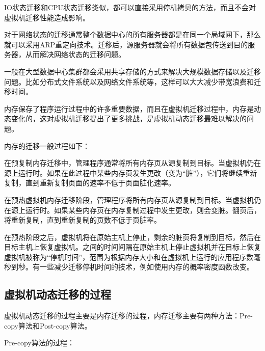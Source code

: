 IO状态迁移和CPU状态迁移类似，都可以直接采用停机拷贝的方法，而且不会对虚拟机迁移性能造成影响。

对于网络状态的迁移通常整个数据中心的所有服务器都是在同一个局域网下，那么就可以采用ARP重定向技术。迁移后，源服务器就会将所有数据包传送到目的服务器，从而解决网络状态的迁移问题。
           
一般在大型数据中心集群都会采用共享存储的方式来解决大规模数据存储以及迁移问题。比如分布式文件系统以及网络文件系统等，这样可以大大减少带宽浪费和迁移时间。

内存保存了程序运行过程中的许多重要数据，而且在虚拟机迁移过程中，内存是动态变化的，这对虚拟机迁移提出了更多挑战，是虚拟机动态迁移最难以解决的问题。

内存的迁移一般过程如下：

在预复制内存迁移中，管理程序通常将所有内存页从源复制到目标。当虚拟机仍在源上运行时。如果在此过程中某些内存页发生更改（变为“脏”），它们将继续重新复制，直到重新复制页面的速率不低于页面脏化速率。

在预热虚拟机内存迁移阶段，管理程序将所有内存页从源复制到目标。当虚拟机仍在源上运行时。如果某些内存页在内存复制过程中发生更改，则会变脏。翻页后，将重新复制，直到重新复制的页数不低于页脏率。

在预热阶段之后，虚拟机将在原始主机上停止，剩余的脏页将复制到目标，然后在目标主机上恢复虚拟机。之间的时间间隔在原始主机上停止虚拟机并在目标上恢复虚拟机被称为“停机时间”，范围为根据内存大小和在虚拟机上运行的应用程序数毫秒到秒。有一些减少迁移停机时间的技术，例如使用内存的概率密度函数改变。

\subsection{虚拟机动态迁移的过程}
虚拟机动态迁移的过程主要是内存迁移的过程，内存迁移主要有两种方法：Pre-copy算法和Post-copy算法\cite{Aidan}。

Pre-copy算法的过程：

